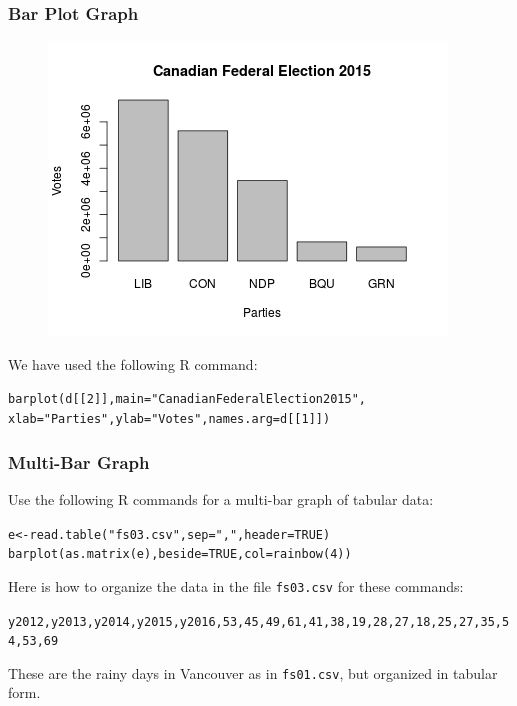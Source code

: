 \documentclass[xcolor=dvipsnames]{beamer}
\begin{document}
\begin{frame}
  \frametitle{Bar Plot Graph}
\begin{figure}[h]
\includegraphics[scale=.5]{./diagrams/barplot.png}
\end{figure}
We have used the following R command: 
\begin{alltt}
\small
barplot(d[[2]], main="Canadian Federal Election 2015",\newline
xlab="Parties",ylab="Votes",names.arg=d[[1]])
\end{alltt}
\end{frame}

\begin{frame}
  \frametitle{Multi-Bar Graph}
Use the following R commands for a multi-bar graph of tabular data: 
\begin{alltt}
\small
e<-read.table("fs03.csv",sep=",",header=TRUE)\newline
barplot(as.matrix(e),beside=TRUE,col=rainbow(4))
\end{alltt}
Here is how to organize the data in the file \texttt{fs03.csv} for these commands:
\begin{alltt}
\small
y2012,y2013,y2014,y2015,y2016,53,45,49,61,41,38,19,28,27,18,25,27,35,54,53,69
\end{alltt}
These are the rainy days in Vancouver as in \texttt{fs01.csv}, but
organized in tabular form.
\end{frame}
\end{document}
